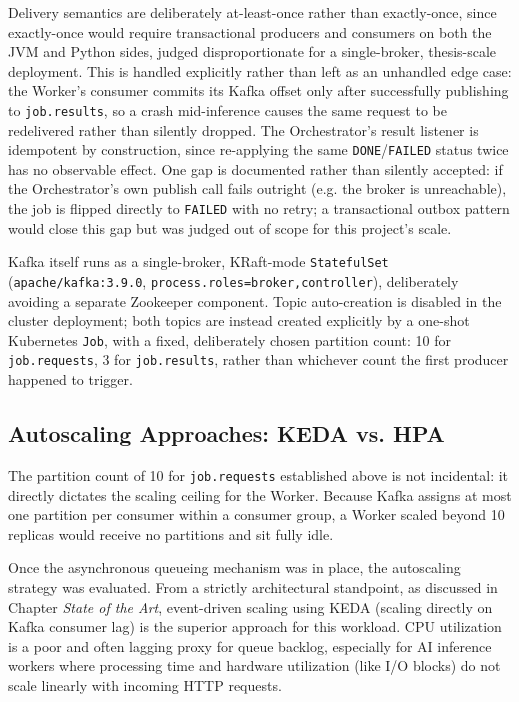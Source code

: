 \documentclass[twoside]{supsistudent}
\begin{document}
Delivery semantics are deliberately at-least-once rather than exactly-once, since exactly-once would require transactional producers and consumers on both the JVM and Python sides, judged disproportionate for a single-broker, thesis-scale deployment. This is handled explicitly rather than left as an unhandled edge case: the Worker's consumer commits its Kafka offset only after successfully publishing to \texttt{job.results}, so a crash mid-inference causes the same request to be redelivered rather than silently dropped. The Orchestrator's result listener is idempotent by construction, since re-applying the same \texttt{DONE}/\texttt{FAILED} status twice has no observable effect. One gap is documented rather than silently accepted: if the Orchestrator's own publish call fails outright (e.g. the broker is unreachable), the job is flipped directly to \texttt{FAILED} with no retry; a transactional outbox pattern would close this gap but was judged out of scope for this project's scale.

Kafka itself runs as a single-broker, KRaft-mode \texttt{StatefulSet} \\ (\texttt{apache/kafka:3.9.0}, \texttt{process.roles=broker,controller}), deliberately avoiding a separate Zookeeper component. Topic auto-creation is disabled in the cluster deployment; both topics are instead created explicitly by a one-shot Kubernetes \texttt{Job}, with a fixed, deliberately chosen partition count: 10 for \texttt{job.requests}, 3 for \texttt{job.results}, rather than whichever count the first producer happened to trigger. 

\subsection{Autoscaling Approaches: KEDA vs. HPA}
The partition count of 10 for \texttt{job.requests} established above is not incidental: it directly dictates the scaling ceiling for the Worker. Because Kafka assigns at most one partition per consumer within a consumer group, a Worker scaled beyond 10 replicas would receive no partitions and sit fully idle. 

Once the asynchronous queueing mechanism was in place, the autoscaling strategy was evaluated. From a strictly architectural standpoint, as discussed in Chapter \emph{State of the Art}, event-driven scaling using KEDA (scaling directly on Kafka consumer lag) is the superior approach for this workload. CPU utilization is a poor and often lagging proxy for queue backlog, especially for AI inference workers where processing time and hardware utilization (like I/O blocks) do not scale linearly with incoming HTTP requests. 
\end{document}
